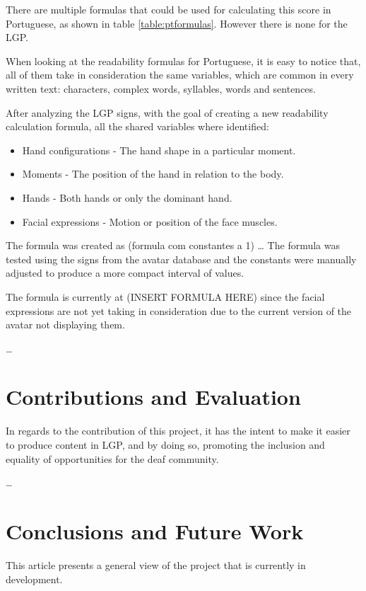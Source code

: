 \documentclass[runningheads]{llncs}
\begin{document}
There are multiple formulas that could be used for calculating this score in Portuguese, as shown in table \ref{table:ptformulas}.
However there is none for the LGP.

When looking at the readability formulas for Portuguese, it is easy to notice that, all of them take in consideration the same variables, which are common in every written text: characters, complex words, syllables, words and sentences.

After analyzing the LGP signs, with the goal of creating a new readability calculation formula, all the shared variables where identified:

\begin{itemize}
    \item Hand configurations - The hand shape in a particular moment.
    \item Moments - The position of the hand in relation to the body.
    \item Hands - Both hands or only the dominant hand.
    \item Facial expressions - Motion or position of the face muscles.
\end{itemize}


The formula was created as (formula com constantes a 1) \dots
The formula was tested using the signs from the avatar database and the constants were manually adjusted to produce a more compact interval of values.

The formula is currently at (INSERT FORMULA HERE) since the facial expressions are not yet taking in consideration due to the current version of the avatar not displaying them.

\dots

\section{Contributions and Evaluation}

In regards to the contribution of this project, it has the intent to make it easier to produce content in LGP, and by doing so, promoting the inclusion and equality of opportunities for the deaf community.

\dots

\section{Conclusions and Future Work}

This article presents a general view of the project that is currently in development.
\end{document}
